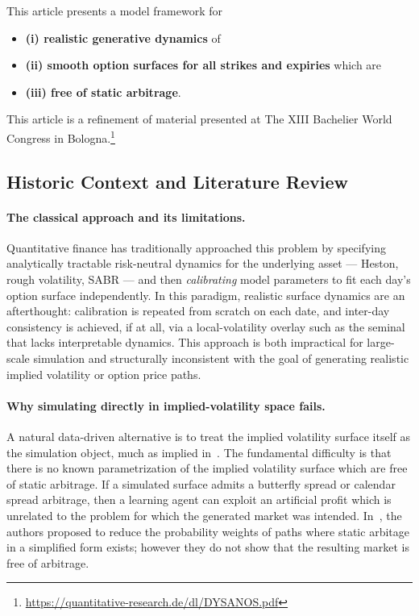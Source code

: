 \documentclass[11pt,a4paper]{article}
\begin{document}
\noindent
This article presents a model framework for
\begin{itemize}
    \item  \textbf{(i) realistic generative dynamics} of
    \item  \textbf{(ii) smooth option surfaces for all strikes and expiries} which are
    \item  \textbf{(iii) free of static arbitrage}.
\end{itemize}
%
This article is a refinement of material presented at The XIII Bachelier World Congress in Bologna.\footnote{\url{https://quantitative-research.de/dl/DYSANOS.pdf}}

\subsection*{Historic Context and Literature Review}

\paragraph{The classical approach and its limitations.}
Quantitative finance has traditionally approached this problem by specifying
analytically tractable risk-neutral dynamics for the underlying asset ---
Heston, rough volatility, SABR --- and then \emph{calibrating} model parameters
to fit each day's option surface independently.
In this paradigm, realistic surface dynamics are an afterthought: calibration is repeated
from scratch on each date, and inter-day consistency is achieved, if at all, via
a local-volatility overlay such as the seminal~\cite{Guyon2011TheSC} that  lacks
interpretable dynamics.
This approach is both impractical for large-scale simulation and structurally inconsistent
with the goal of generating realistic implied volatility or option price
paths.

\paragraph{Why simulating directly in implied-volatility space fails.}
A natural data-driven alternative is to treat the implied volatility surface itself
as the simulation object, much as implied in~\cite{ContVol}.
The fundamental difficulty is that there is no known parametrization  of
the implied volatility surface which are free of static
arbitrage.
If a simulated surface admits a butterfly spread or calendar spread arbitrage,
then a learning agent can exploit an artificial profit which is unrelated to the
problem for which the generated market was intended.
In~\cite{Cont04032023Simulat},
the authors proposed to reduce the probability weights of paths where
static arbitage in a simplified form exists; however they do not show that the resulting market is free
of arbitrage.
\end{document}
